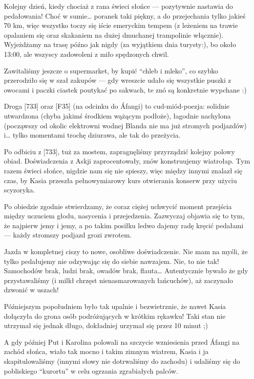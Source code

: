 Kolejny dzień, kiedy chociaż z rana świeci słońce --- pozytywnie nastawia do pedałowania! Choć w sumie… poranek taki piękny, a do przejechania tylko jakieś 70 km, więc wszystko toczy się iście emeryckim tempem (z leżeniem na trawie opalaniem się oraz skakaniem na dużej dmuchanej trampolinie włącznie). Wyjeżdżamy na trasę późno jak nigdy (za wyjątkiem dnia turysty:), bo około 13:00, ale wszyscy zadowoleni z miło spędzonych chwil.

Zawitaliśmy jeszcze o supermarket, by kupić “chleb i mleko”, co szybko przerodziło się w szał zakupów --- gdy wreszcie udało się wszystkie puszki z owocami i paczki ciastek poutykać po sakwach, te znó są konkretnie wypchane :)

Droga [733] oraz [F35] (na odcinku do Áfangi) to cud-miód-poezja: solidnie utwardzona (chyba jakimś środkiem wążącym podłoże), łagodnie nachylona (począwszy od okolic elektrowni wodnej Blanda nie ma już stromych podjazdów) i… tylko momentami trochę dziurawa, ale tak do przeżycia.

Po odbiciu z [733], tuż za mostem, zapragnęliśmy przyrządzić kolejny polowy obiad. Doświadczenia z Askji zaprocentowały, znów konstruujemy wiatrołap. Tym razem świeci słońce, nigdzie nam się nie spieszy, więc między innymi znalazł się czas, by Kasia przeszła pełnowymiarowy kurs otwierania konserw przy użyciu scyzoryka.

Po obiedzie zgodnie stwierdzamy, że coraz ciężej uchwycić moment przejścia między uczuciem głodu, nasycenia i przejedzenia. Zazwyczaj objawia się to tym, że najpierw jemy i jemy, a po takim posiłku ledwo dajemy radę kręcić pedałami --- każdy stromszy podjazd grozi zwrotem.

Jazda w kompletnej ciszy to nowe, osobliwe doświadczenie. Nie mam na myśli, że tylko pedałujemy nie odzywając się do siebie nawzajem. Nie, to nie tak! Samochodów brak, ludzi brak, owadów brak, flauta… Autentycznie bywało że gdy przystawaliśmy (i milkł chrzęst nienasmarowanych łańcuchów), aż zaczynało dzwonić w uszach!

Późniejszym popołudniem było tak upalnie i bezwietrznie, że nawet Kasia dołączyła do grona osób podróżujących w krótkim rękawku! Taki stan nie utrzymał się jednak długo, dokładniej urzymał się przez 10 minut ;)

A gdy później Put i Karolina polowali na szczycie wzniesienia przed Áfangi na zachód słońca, wiało tak mocno i takim zimnym wiatrem, Kasia i ja skapitulowaliśmy (innymi słowy nie dotrwaliśmy do zachodu) i udaliśmy się do pobliskiego “kurortu” w celu ogrzania zgrabiałych palców.

